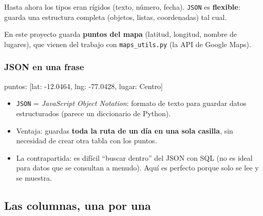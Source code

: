 \documentclass[11pt,a4paper]{article}
\begin{document}
Hasta ahora los tipos eran rígidos (texto, número, fecha). \texttt{JSON} es \textbf{flexible}:
guarda una estructura completa (objetos, listas, coordenadas) tal cual.

En este proyecto guarda \textbf{puntos del mapa} (latitud, longitud, nombre de lugares),
que vienen del trabajo con \texttt{maps\_utils.py} (la API de Google Maps).

\subsubsection{JSON en una frase}

\begin{center}
\colorbox{fondocodigo}{\parbox{0.92\textwidth}{\ttfamily\small
{}puntos: [lat: -12.0464, lng: -77.0428, lugar: Centro]
}}
\end{center}

\begin{itemize}
    \item \texttt{JSON} = \emph{JavaScript Object Notation}: formato de texto para guardar
    datos estructurados (parece un diccionario de Python).
    \item Ventaja: guardas \textbf{toda la ruta de un día en una sola casilla}, sin necesidad
    de crear otra tabla con los puntos.
    \item La contrapartida: es difícil ``buscar dentro'' del JSON con SQL (no es ideal para
    datos que se consultan a menudo). Aquí es perfecto porque solo se lee y se muestra.
\end{itemize}

\subsection{Las columnas, una por una}
\end{document}
